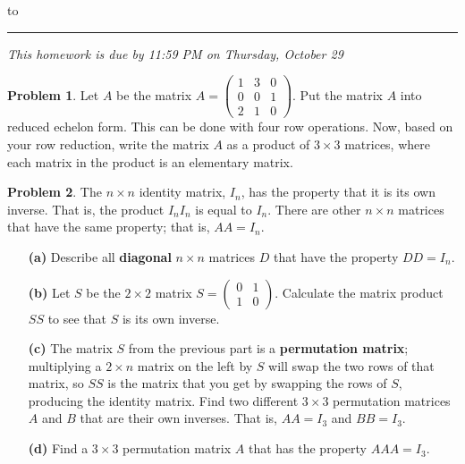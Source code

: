 \documentclass[11pt]{article}
\theoremstyle{definition}
\newtheorem{problem}{Problem}
\newenvironment{answer}{\par\bigskip\bgroup\color{darkblue}}{\egroup}
\begin{document}
\hbox to 
\nointerlineskip
\vskip 2pt
\hrule height 1pt

\medskip

\centerline{\textit{This homework is due by 11:59 PM on Thursday, October 29}}

\medskip



\begin{problem}
Let $A$ be the matrix 
   $A=\begin{pmatrix}  
      1& 3& 0\\
      0& 0& 1\\
      2& 1& 0
   \end{pmatrix}$.  
Put the matrix $A$ into reduced echelon form.  This can be done with four row operations.
Now, based on your row reduction, write the matrix $A$ as a product of $3\times 3$ matrices, 
where each matrix in the product is an elementary matrix.
\end{problem}

\begin{answer}
\end{answer}




\begin{problem}
The $n\times n$ identity matrix, $I_n$, has the property that it is its
own inverse.  That is, the product $I_nI_n$ is equal to $I_n$.  There are
other $n\times n$ matrices that have the same property; that is, $AA=I_n$.
\begin{itemize}
\item[\bf(a)] Describe all \textbf{diagonal} $n\times n$ matrices $D$ that 
   have the property $DD=I_n$.
\item[\bf(b)]  Let $S$ be the $2\times 2$ matrix $S=\begin{pmatrix}0&1\\1&0\end{pmatrix}$.  Calculate the matrix
   product $SS$ to see that $S$ is its own inverse. 
\item[\bf(c)]  The matrix $S$ from the previous part is a \textbf{permutation matrix};
multiplying a $2\times n$ matrix on the left by $S$ will swap the two rows of that matrix, so
$SS$ is the matrix that you get by swapping the rows of $S$, producing the identity 
matrix.  Find two different $3\times 3$ permutation matrices $A$ and $B$ that are their own inverses.
That is, $AA=I_3$ and $BB=I_3$.
\item[\bf(d)]  Find a $3\times 3$ permutation matrix $A$ that has the property $AAA=I_3$.
\end{itemize}
\end{problem}
\end{document}
